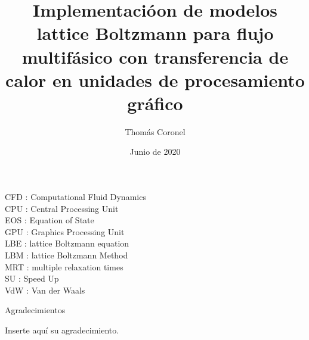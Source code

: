 \documentclass[12pt,papel,oneside]{ibtesis}
\title{Implementacióon de modelos lattice Boltzmann para flujo multifásico con transferencia de calor en unidades de procesamiento gráfico}
\author{Thomás Coronel}
\date{Junio de 2020}
\begin{document}

\begin{preliminary}





\tableofcontents                %

\begin{abreviaturas}
	
	CFD : Computational Fluid Dynamics\\
	
	CPU : Central Processing Unit\\
	
	EOS : Equation of State\\
	
	GPU : Graphics Processing Unit\\
	
	LBE : lattice Boltzmann equation\\
	
	LBM : lattice Boltzmann Method\\
	
	MRT : multiple relaxation times\\
	
	SU  : Speed Up\\
	
	VdW : Van der Waals\\
	
	
\end{abreviaturas}

\end{preliminary}








\appendix
%

%
%
%


\begin{biblio}

\end{biblio}


\begin{postliminary}

\listoffigures                  %

\listoftables                   %

\begin{seccion}{Agradecimientos}
\begin{small}	

Inserte aquí su agradecimiento.

\end{small}


\end{seccion}


\end{postliminary}
\end{document}
